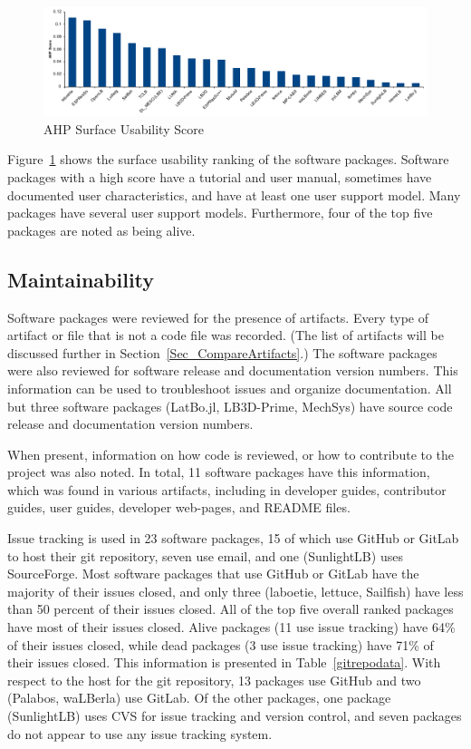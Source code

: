 \documentclass[final, 3p, times, authoryear]{elsarticle}
\begin{document}
\begin{figure}[h!]
	\begin{center}
		\includegraphics[width=1.0\textwidth]{./figures/usability_chart.pdf}
		\caption{AHP Surface Usability Score}
		\label{Fig_Usability}
	\end{center}
\end{figure}

Figure~\ref{Fig_Usability} shows the surface usability ranking of the software
packages. Software packages with a high score have a tutorial and user manual,
sometimes have documented user characteristics, and have at least one user
support model. Many packages have several user support models. Furthermore, four
of the top five packages are noted as being alive. 

\subsection{Maintainability} \label{Sec_Maintainability}

Software packages were reviewed for the presence of artifacts. Every type of
artifact or file that is not a code file was recorded. (The list of artifacts
will be discussed further in Section~\ref{Sec_CompareArtifacts}.)  The software
packages were also reviewed for software release and documentation version
numbers. This information can be used to troubleshoot issues and organize
documentation. All but three software packages (LatBo.jl, LB3D-Prime, MechSys)
have source code release and documentation version numbers.

When present, information on how code is reviewed, or how to contribute to the
project was also noted. In total, 11 software packages have this information,
which was found in various artifacts, including in developer guides, contributor
guides, user guides, developer web-pages, and README files. 

Issue tracking is used in 23 software packages, 15 of which use GitHub or GitLab
to host their git repository, seven use email, and one (SunlightLB) uses
SourceForge. Most software packages that use GitHub or GitLab have the majority
of their issues closed, and only three (laboetie, lettuce, Sailfish) have less
than 50 percent of their issues closed. All of the top five overall ranked
packages have most of their issues closed. Alive packages (11 use issue
tracking) have 64\% of their issues closed, while dead packages (3 use issue
tracking) have 71\% of their issues closed. This information is presented in
Table~\ref{gitrepodata}. With respect to the host for the git repository, 13
packages use GitHub and two (Palabos, waLBerla) use GitLab. Of the other
packages, one package (SunlightLB) uses CVS for issue tracking and version
control, and seven packages do not appear to use any issue tracking system.
\end{document}
